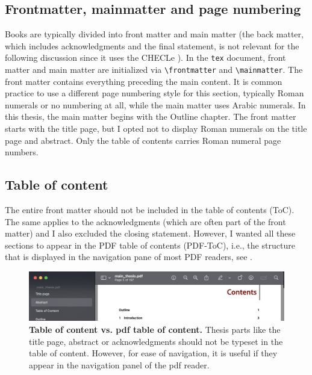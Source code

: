 \subsection{Frontmatter, mainmatter and page numbering}
Books are typically divided into front matter and main matter (the back matter, which includes acknowledgments and the final statement, is not relevant for the following discussion since it uses the CHECLe
). In the \verb|tex| document, front matter and main matter are initialized via \verb|\frontmatter| and \verb|\mainmatter|. The front matter contains everything preceding the main content. It is common practice to use a different page numbering style for this section, typically Roman numerals or no numbering at all, while the main matter uses Arabic numerals.
In this thesis, the main matter begins with the Outline chapter. The front matter starts with the title page, but I opted not to display Roman numerals on the title page and abstract. Only the table of contents carries Roman numeral page numbers.

\subsection{Table of content}
The entire front matter should not be included in the table of contents (ToC). The same applies to the acknowledgments (which are often part of the front matter) and I also excluded the closing statement. However, I wanted all these sections to appear in the PDF table of contents (PDF-ToC), i.e., the structure that is displayed in the navigation pane of most PDF readers, see .

\begin{figure}
	\includegraphics[width = \textwidth]{pdf-toc.png}
	\caption{\textbf{Table of content vs. pdf table of content.} Thesis parts like the title page, abstract or acknowledgments should not be typeset in the table of content. However, for ease of navigation, it is useful if they appear in the navigation panel of the pdf reader.}
	\label{fig:pdf-toc}
\end{figure}

